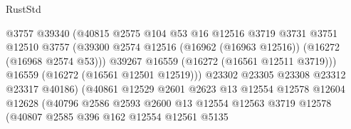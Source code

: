 \begin{lexlean}{RustStd}
\begin{coremodule}
                                        @3757
                                        @39340
                                        (@40815
                                          @2575
                                          @104
                                          @53
                                          @16
                                          @12516
                                          @3719
                                          @3731
                                          @3751
                                          @12510
                                          @3757
                                          (@39300
                                            @2574
                                            @12516
                                            (@16962 (@16963 @12516))
                                            (@16272 (@16968 @2574 @53)))
                                          @39267
                                          @16559
                                          (@16272 (@16561 @12511 @3719)))
                                        @16559
                                        (@16272 (@16561 @12501 @12519)))
                                      @23302
                                      @23305
                                      @23308
                                      @23312
                                      @23317
                                      @40186)
                                    (@40861
                                      @12529
                                      @2601
                                      @2623
                                      @13
                                      @12554
                                      @12578
                                      @12604
                                      @12628
                                      (@40796
                                        @2586
                                        @2593
                                        @2600
                                        @13
                                        @12554
                                        @12563
                                        @3719
                                        @12578
                                        (@40807
                                          @2585
                                          @396
                                          @162
                                          @12554
                                          @12561
                                          @5135

\end{coremodule}
\end{lexlean}

